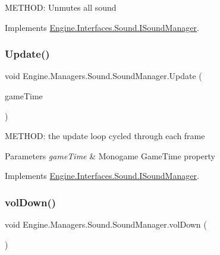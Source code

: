 M\+E\+T\+H\+OD\+: Unmutes all sound 



Implements \hyperlink{a00482_a59c011a4cf667d6e967bddad50c7cb2f}{Engine.\+Interfaces.\+Sound.\+I\+Sound\+Manager}.

\mbox{\label{a00546_a43e47a47daa91f3b1d0f38b3dcb0323e}} 
\subsubsection{\texorpdfstring{Update()}{Update()}}
{\footnotesize\ttfamily void Engine.\+Managers.\+Sound.\+Sound\+Manager.\+Update (\begin{DoxyParamCaption}\item[{Game\+Time}]{game\+Time }\end{DoxyParamCaption})\hspace{0.3cm}{\ttfamily [inline]}}



M\+E\+T\+H\+OD\+: the update loop cycled through each frame 


\begin{DoxyParams}{Parameters}
{\em game\+Time} & Monogame Game\+Time property\\
\hline
\end{DoxyParams}


Implements \hyperlink{a00482_af7ddcb52a6283aa2cf4392c75d2a0cff}{Engine.\+Interfaces.\+Sound.\+I\+Sound\+Manager}.

\mbox{\label{a00546_a888a7942f63cc582f7b73d61b69ebbac}} 
\subsubsection{\texorpdfstring{vol\+Down()}{volDown()}}
{\footnotesize\ttfamily void Engine.\+Managers.\+Sound.\+Sound\+Manager.\+vol\+Down (\begin{DoxyParamCaption}{ }\end{DoxyParamCaption})\hspace{0.3cm}{\ttfamily [inline]}}



